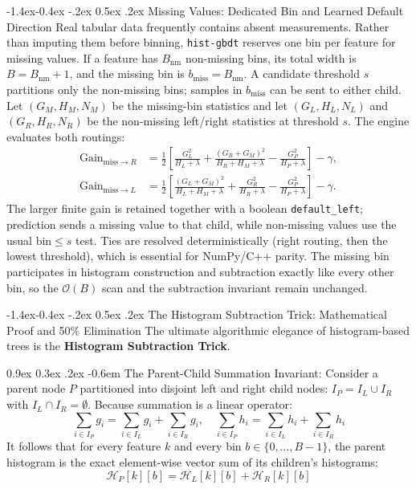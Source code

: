 \documentclass[11pt,a4paper]{article}
\makeatletter
\renewcommand\subsection{\@startsection{subsection}{2}{\z@}%
                                     {-1.4ex\@plus -0.4ex \@minus -.2ex}%
                                     {0.5ex \@plus .2ex}%
                                     {\normalfont\normalsize\bfseries}}
\renewcommand\paragraph{\@startsection{paragraph}{4}{\z@}%
                                     {0.9ex \@plus0.3ex \@minus.2ex}%
                                     {-0.6em}%
                                     {\normalfont\normalsize\bfseries}}
\newcommand{\Gain}{\operatorname{Gain}}
\makeatother
\begin{document}
\subsection{Missing Values: Dedicated Bin and Learned Default Direction}
\label{sec:missing_values}
Real tabular data frequently contains absent measurements. Rather than imputing them before binning, \texttt{hist-gbdt} reserves one bin per feature for missing values. If a feature has $B_{\text{nm}}$ non-missing bins, its total width is $B = B_{\text{nm}} + 1$, and the missing bin is $b_{\text{miss}} = B_{\text{nm}}$. A candidate threshold $s$ partitions only the non-missing bins; samples in $b_{\text{miss}}$ can be sent to either child. Let $(G_M, H_M, N_M)$ be the missing-bin statistics and let $(G_L, H_L, N_L)$ and $(G_R, H_R, N_R)$ be the non-missing left/right statistics at threshold $s$. The engine evaluates both routings:
\begin{align}
    \Gain_{\text{miss}\to R} &= \frac{1}{2}\left[\frac{G_L^2}{H_L+\lambda} + \frac{(G_R+G_M)^2}{H_R+H_M+\lambda} - \frac{G_P^2}{H_P+\lambda}\right] - \gamma, \\
    \Gain_{\text{miss}\to L} &= \frac{1}{2}\left[\frac{(G_L+G_M)^2}{H_L+H_M+\lambda} + \frac{G_R^2}{H_R+\lambda} - \frac{G_P^2}{H_P+\lambda}\right] - \gamma.
\end{align}
The larger finite gain is retained together with a boolean \texttt{default\_left}; prediction sends a missing value to that child, while non-missing values use the usual $\text{bin} \le s$ test. Ties are resolved deterministically (right routing, then the lowest threshold), which is essential for NumPy/C++ parity. The missing bin participates in histogram construction and subtraction exactly like every other bin, so the $\mathcal{O}(B)$ scan and the subtraction invariant remain unchanged.

\subsection{The Histogram Subtraction Trick: Mathematical Proof and 50\% Elimination}
The ultimate algorithmic elegance of histogram-based trees is the \textbf{Histogram Subtraction Trick}.

\paragraph{The Parent-Child Summation Invariant:}
Consider a parent node $P$ partitioned into disjoint left and right child nodes: $I_P = I_L \cup I_R$ with $I_L \cap I_R = \emptyset$. Because summation is a linear operator:
\begin{equation}
    \sum_{i \in I_P} g_i = \sum_{i \in I_L} g_i + \sum_{i \in I_R} g_i, \quad \sum_{i \in I_P} h_i = \sum_{i \in I_L} h_i + \sum_{i \in I_R} h_i
\end{equation}
It follows that for every feature $k$ and every bin $b \in \{0, \dots, B-1\}$, the parent histogram is the exact element-wise vector sum of its children's histograms:
\begin{equation}
    \mathcal{H}_P[k][b] = \mathcal{H}_L[k][b] + \mathcal{H}_R[k][b]
    \label{eq:hist_additivity}
\end{equation}
\end{document}
